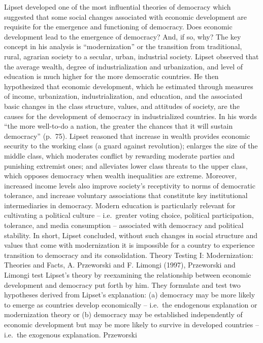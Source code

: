 \documentclass{book}
\begin{document}
Lipset developed one of the most influential theories of democracy which
suggested that some social changes associated with economic development are
requisite for the emergence and functioning of democracy. Does economic
development lead to the emergence of democracy? And, if so, why? The key
concept in his analysis is ``modernization'' or the transition from
traditional, rural, agrarian society to a secular, urban, industrial society.
Lipset observed that the average wealth, degree of industrialization and
urbanization, and level of education is much higher for the more democratic
countries. He then hypothesized that economic development, which he estimated
through measures of income, urbanization, industrialization, and education,
and the associated basic changes in the class structure, values, and attitudes
of society, are the causes for the development of democracy in industrialized
countries. In his words ``the more well-to-do a nation, the greater the
chances that it will sustain democracy'' (p.~75). Lipset reasoned that
increase in wealth provides economic security to the working class (a guard
against revolution); enlarges the size of the middle class, which moderates
conflict by rewarding moderate parties and punishing extremist ones; and
alleviates lower class threats to the upper class, which opposes democracy
when wealth inequalities are extreme. Moreover, increased income levels also
improve society's receptivity to norms of democratic tolerance, and increase
voluntary associations that constitute key institutional intermediaries in
democracy. Modern education is particularly relevant for cultivating a
political culture -- i.e.~greater voting choice, political participation,
tolerance, and media consumption -- associated with democracy and political
stability. In short, Lipset concluded, without such changes in social
structure and values that come with modernization it is impossible for a
country to experience transition to democracy and its consolidation. Theory
Testing I: Modernization: Theories and Facts, A. Przeworski and F. Limongi
(1997), Przeworski and Limongi test Lipset's theory by reexamining the
relationship between economic development and democracy put forth by him. They
formulate and test two hypotheses derived from Lipset's explanation: (a)
democracy may be more likely to emerge as countries develop economically --
i.e.~the endogenous explanation or modernization theory or (b) democracy may
be established independently of economic development but may be more likely to
survive in developed countries -- i.e.~the exogenous explanation. Przeworski
\end{document}
